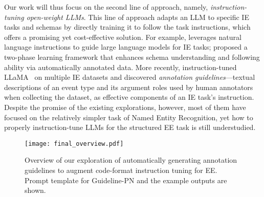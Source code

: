 Our work will thus focus on the second line of approach, namely, \emph{instruction-tuning open-weight LLMs}. This line of approach adapts an LLM to specific IE tasks and schemas by directly training it to follow the task instructions, which offers a promising yet cost-effective solution. For example, \citet{wang2023instructuiemultitaskinstructiontuning}  leverages natural language instructions to
guide large language models for IE tasks; \citet{li-etal-2024-knowcoder} proposed a two-phase learning framework that enhances schema understanding and following ability via automatically annotated data. More recently, \citet{sainz2024gollie} instruction-tuned LLaMA~\cite{touvron2023llamaopenefficientfoundation} on multiple IE datasets and discovered \emph{annotation guidelines}---textual descriptions of an event type and its argument roles used by human annotators when collecting the dataset, as effective components of an IE task's instruction. Despite the promise of the existing explorations, however, most of them have focused on the relatively simpler task of Named Entity Recognition, yet how to properly instruction-tune LLMs for the structured EE task is still understudied.
\begin{figure*}[t!]
    \centering
    \texttt{[image: final\_overview.pdf]}
    \caption{Overview of our exploration of automatically generating annotation guidelines to augment code-format instruction tuning for EE. Prompt template for Guideline-PN and the example outputs are shown.
    }
    \label{fig:overview}
\end{figure*}
